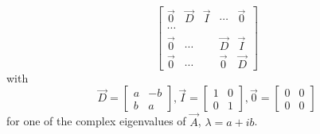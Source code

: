 \begin{theorem}
\begin{equation}
\begin{bmatrix}
			\vec 0 	& \vec D 	& \vec I	& \cdots 	& \vec 0 \\
			\cdots 	&			&			&		 	& \\
			\vec 0 	& \cdots 	& 			& \vec D 	& \vec I	\\
			\vec 0 	& \cdots	&			& \vec 0 	& \vec D
		\end{bmatrix}
	\end{equation}
	with
	\begin{equation*}
		\vec D =
		\begin{bmatrix}
			a & -b \\
			b & a
		\end{bmatrix},
		\vec I = 
		\begin{bmatrix}
			1 & 0 \\
			0 & 1
		\end{bmatrix},
		\vec 0 = 
		\begin{bmatrix}
			0 & 0 \\
			0 & 0
		\end{bmatrix}
	\end{equation*}
	for one of the complex eigenvalues of $\vec A$, $\lambda = a + ib$.
\end{theorem}

